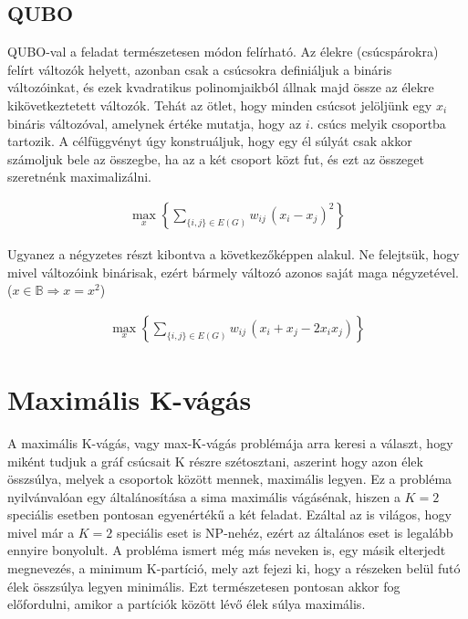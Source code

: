\subsection{QUBO}

QUBO-val a feladat természetesen módon felírható. Az élekre (csúcspárokra) felírt változók helyett, azonban csak a csúcsokra definiáljuk a bináris változóinkat, és ezek kvadratikus polinomjaikból állnak majd össze az élekre kikövetkeztetett változók. Tehát az ötlet, hogy minden csúcsot jelöljünk egy $x_i$ bináris változóval, amelynek értéke mutatja, hogy az $i.$ csúcs melyik csoportba tartozik. A célfüggvényt úgy konstruáljuk, hogy egy él súlyát csak akkor számoljuk bele az összegbe, ha az a két csoport közt fut, és ezt az összeget szeretnénk maximalizálni.

\begin{align}
	\max_{x} \left\{ \sum_{\{i,j\} \in E(G)}{w_{ij} \, (x_i-x_j)^2}\right\}
\end{align}

Ugyanez a négyzetes részt kibontva a következőképpen alakul. Ne felejtsük, hogy mivel változóink binárisak, ezért bármely változó azonos saját maga négyzetével. ($x \in \mathbb{B} \Rightarrow x = x^2$)

\begin{align}
	\max_{x} \left\{ \sum_{\{i,j\} \in E(G)}{w_{ij} \, (x_i+x_j-2 x_i x_j)}\right\}
\end{align}


\section{Maximális K-vágás}

A maximális K-vágás, vagy max-K-vágás problémája arra keresi a választ, hogy miként tudjuk a gráf csúcsait K részre szétosztani, aszerint hogy azon élek összsúlya, melyek a csoportok között mennek, maximális legyen. Ez a probléma nyilvánvalóan egy általánosítása a sima maximális vágásénak, hiszen a $K=2$ speciális esetben pontosan egyenértékű a két feladat. Ezáltal az is világos, hogy mivel már a $K=2$ speciális eset is NP-nehéz, ezért az általános eset is legalább ennyire bonyolult.
A probléma ismert még más neveken is, egy másik elterjedt megnevezés, a minimum K-partíció, mely azt fejezi ki, hogy a részeken belül futó élek összsúlya legyen minimális. Ezt természetesen pontosan akkor fog előfordulni, amikor a partíciók között lévő élek súlya maximális.

